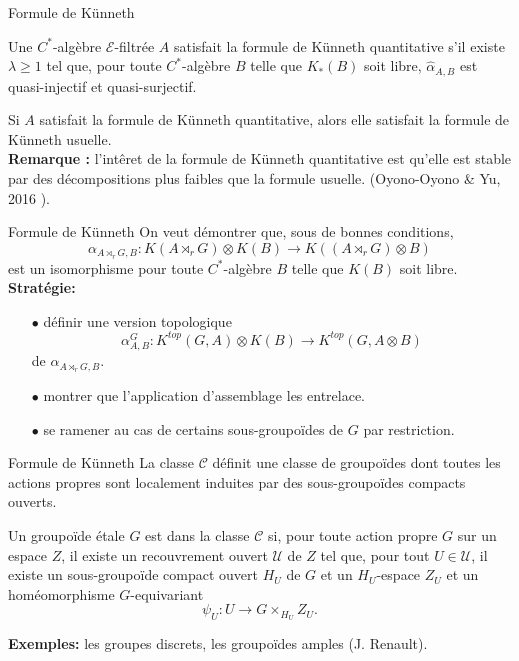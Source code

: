 \begin{frame}{Formule de Künneth}
\begin{definitionfr}
Une $C^*$-algèbre $\mathcal E$-filtrée $A$ satisfait la formule de Künneth quantitative s'il existe $\lambda \geq 1$ tel que, pour toute $C^*$-algèbre $B$ telle que $K_*(B)$ soit libre, $\hat\alpha_{A,B}$ est quasi-injectif et quasi-surjectif. 
\end{definitionfr}

Si $A$ satisfait la formule de Künneth quantitative, alors elle satisfait la formule de Künneth usuelle.\\
\vspace{0.3 cm}
\textbf{Remarque :} l'intêret de la formule de Künneth quantitative est qu'elle est stable par des décompositions plus faibles que la formule usuelle. (Oyono-Oyono \& Yu, 2016 \cite{OY4}).
\end{frame}


\begin{frame}{Formule de Künneth}
On veut démontrer que, sous de bonnes conditions,  
\[\alpha_{A\rtimes_r G,B} : K(A\rtimes_r G)\otimes K(B) \rightarrow K((A\rtimes_r G)\otimes B)\]
est un isomorphisme pour toute $C^*$-algèbre $B$ telle que $K(B)$ soit libre.\\
\vspace{0.3 cm}
\textbf{Stratégie:}
\begin{itemize}
\item[$\bullet$] définir une version topologique 
\[\alpha_{A,B}^{G} : K^{top}(G,A)\otimes K(B) \rightarrow K^{top}(G,A\otimes B)\]
de $\alpha_{A\rtimes_r G,B}$.
\item[$\bullet$] montrer que l'application d'assemblage les entrelace.
\item[$\bullet$] se ramener au cas de certains sous-groupoïdes de $G$ par restriction.
\end{itemize}
\end{frame}

\begin{frame}{Formule de Künneth}
La classe $\mathcal C$ définit une classe de groupoïdes dont toutes les actions propres sont localement induites par des sous-groupoïdes compacts ouverts. 
\vspace{0.3 cm}
\begin{definitionfr}
Un groupoïde étale $G$ est dans la classe $\mathcal C$ si, pour toute action propre $G$ sur un espace $Z$, il existe un recouvrement ouvert $\mathcal U$ de $Z$ tel que, pour tout $U\in\mathcal U$, il existe un sous-groupoïde compact ouvert $H_U$ de $G$ et un $H_U$-espace $Z_U$ et un homéomorphisme $G$-equivariant
\[\psi_U : U \rightarrow G\times_{H_U} Z_U.\] 
\end{definitionfr}
\vspace{0.3 cm}
\textbf{Exemples:} les groupes discrets, les groupoïdes amples (J. Renault).

\end{frame}


